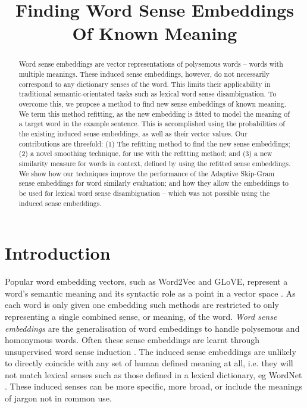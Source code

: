 \documentclass{article}
\def\parencite{\cite}
\begin{document}
\title{Finding Word Sense Embeddings Of Known Meaning}


\maketitle

\begin{abstract}
Word sense embeddings are vector representations of polysemous words -- words with multiple meanings.
These induced sense embeddings, however, do not necessarily correspond to any dictionary senses of the word.
This limits their applicability in traditional semantic-orientated tasks such as lexical word sense disambiguation.
To overcome this, we propose a method to find new sense embeddings of known meaning.
We term this method refitting, as the new embedding is fitted to model the meaning of a target word in the example sentence.
This is accomplished using the probabilities of the existing induced sense embeddings, as well as their vector values.
Our contributions are threefold:
(1) The refitting method to find the new sense embeddings;
 (2) a novel smoothing technique, for use with the refitting method;
and (3) a new similarity measure for words in context, defined by using the refitted sense embeddings.
We show how our techniques improve the performance of the Adaptive Skip-Gram sense embeddings for word similarly evaluation; and how they allow the embeddings to be used for lexical word sense disambiguation -- which was not possible using the induced sense embeddings.
\end{abstract}


\section{Introduction}


Popular word embedding vectors, such as Word2Vec and GLoVE, represent a word's semantic meaning and its syntactic role as a point in a vector space \parencite{mikolov2013efficient,pennington2014glove}.
As each word is only given one embedding such methods are restricted to only representing a single combined sense, or meaning, of the word.
\emph{Word sense embeddings} are the generalisation of word embeddings to handle polysemous and homonymous  words.
Often these sense embeddings are learnt through unsupervised word sense induction \parencite{Reisinger2010,Huang2012,tian2014probabilistic,AdaGrams}.
The induced sense embeddings are unlikely to directly coincide with any set of human defined meaning at all, i.e. they will not match lexical senses such as those defined in a lexical dictionary, eg WordNet \parencite{miller1995wordnet}.
These induced senses can be more specific, more broad, or include the meanings of jargon not in common use.
\end{document}
